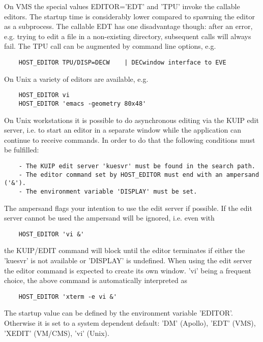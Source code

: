    \par
On VMS the special values EDITOR='EDT' and 'TPU' invoke the callable 
   editors.  The startup time is considerably lower compared to spawning the 
   editor as a subprocess.  The callable EDT has one disadvantage though:  
   after an error, e.g. trying to edit a file in a non-existing directory, 
   subsequent calls will always fail.  The TPU call can be augmented by 
   command line options, e.g.  
\begin{verbatim}
    HOST_EDITOR TPU/DISP=DECW    | DECwindow interface to EVE
\end{verbatim}
\ENDVERB
   \par
On Unix a variety of editors are available, e.g.  
\begin{verbatim}
    HOST_EDITOR vi
    HOST_EDITOR 'emacs -geometry 80x48'
\end{verbatim}
\ENDVERB
   \par
On Unix workstations it is possible to do asynchronous editing via the KUIP 
   edit server, i.e. to start an editor in a separate window while the 
   application can continue to receive commands.  In order to do that the 
   following conditions must be fulfilled:  
\begin{verbatim}
    - The KUIP edit server 'kuesvr' must be found in the search path.
    - The editor command set by HOST_EDITOR must end with an ampersand ('&').
    - The environment variable 'DISPLAY' must be set.
\end{verbatim}
\ENDVERB
   \par
The ampersand flags your intention to use the edit server if possible.  If 
   the edit server cannot be used the ampersand will be ignored, i.e. even 
   with 
\begin{verbatim}
    HOST_EDITOR 'vi &'
\end{verbatim}
   \par
the KUIP/EDIT command will block until the editor terminates if either the 
   'kuesvr' is not available or 'DISPLAY' is undefined.  When using the edit 
   server the editor command is expected to create its own window.  'vi' being 
   a frequent choice, the above command is automatically interpreted as 
\begin{verbatim}
    HOST_EDITOR 'xterm -e vi &'
\end{verbatim}
\ENDVERB
   \par
The startup value can be defined by the environment variable 'EDITOR'.  
   Otherwise it is set to a system dependent default:  'DM' (Apollo), 'EDT' 
   (VMS), 'XEDIT' (VM/CMS), 'vi' (Unix).  

